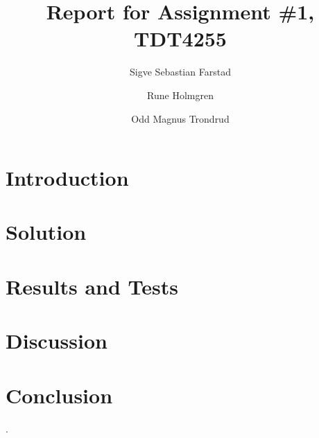 \documentclass[10pt]{report}
\title{Report for Assignment \#1, TDT4255}
\author{Sigve Sebastian Farstad \and
		Rune Holmgren \and
		Odd Magnus Trondrud}
\begin{document}
\maketitle

\begin{abstract}
	
\end{abstract}

\tableofcontents

\chapter{Introduction}
	

\chapter{Solution}
	

\chapter{Results and Tests}
	

\chapter{Discussion}
	

\chapter{Conclusion}
	

\cite{compendium}.


{}

\nocite{*} %
\end{document}
